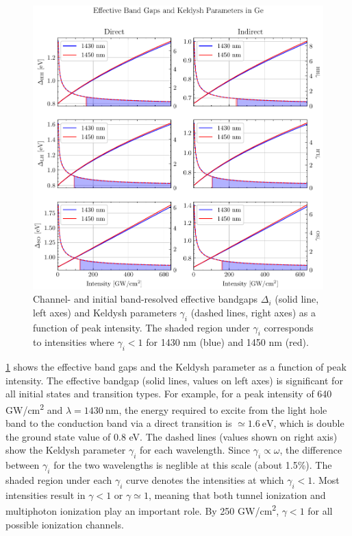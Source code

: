 \begin{figure}
	\centering
	\includegraphics[width=1.0\textwidth]{figures/chap4/Gamma_Gap_Channel_VB_resolved.pdf}
	\caption{Channel- and initial band-resolved effective bandgaps $\Delta_i$ (solid line, left axes) and Keldysh parameters $\gamma_i$ (dashed lines, right axes) as a function of peak intensity. The shaded region under $\gamma_i$ corresponds to intensities where $\gamma_i < 1$ for 1430 nm (blue) and 1450 nm (red).}
	\label{fig:Gamma_Gap_Channel_VB_resolved}
\end{figure}

\cref{fig:Gamma_Gap_Channel_VB_resolved} shows the effective band gaps and the Keldysh parameter as a function of peak intensity. The effective bandgap (solid lines, values on left axes) is significant for all initial states and transition types. For example, for a peak intensity of 640 GW/cm\textsuperscript{2} and $\lambda = 1430 \ \textrm{nm}$, the energy required to excite from the light hole band to the conduction band via a direct transition is $\simeq 1.6 \ \textrm{eV}$, which is double the ground state value of 0.8 eV. The dashed lines (values shown on right axis) show the Keldysh parameter $\gamma_i$ for each wavelength. Since $\gamma_i \propto \omega$, the difference between $\gamma_i$ for the two wavelengths is neglible at this scale (about 1.5\%). The shaded region under each $\gamma_i$ curve denotes the intensities at which $\gamma_i<1$. Most intensities result in $\gamma < 1$ or $\gamma \simeq 1$, meaning that both tunnel ionization and multiphoton ionization play an important role. By 250 GW/cm\textsuperscript{2}, $\gamma < 1$ for all possible ionization channels.

